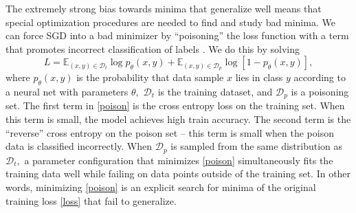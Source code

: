 \documentclass{article}
\begin{document}


The extremely strong bias towards minima that generalize well means that special optimization procedures are needed to find and study bad minima.  We can force SGD into a bad minimizer by ``poisoning'' the loss function with a term that promotes incorrect classification of labels \cite{steinhardt2017poison}.
We do this by solving
    \begin{equation}
        L = \mathbb{E}_{(x,y)\in \mathcal{D}_{t}} \log p_{\theta}(x,y) + \mathbb{E}_{(x,y)\in\mathcal{D}_p}\log[1-p_{\theta}(x,y)],
        \label{poison}
    \end{equation}
%
where $p_{\theta}(x,y)$ is the probability that data sample $x$ lies in class $y$ according to a neural net with parameters $\theta,$ $ \mathcal{D}_{t}$ is the training dataset, and  $\mathcal{D}_{p}$ is a poisoning set.
    The first term in \eqref{poison} is the cross entropy loss on the training set. When this term is small, the model achieves high train accuracy. The second term is the ``reverse'' cross entropy on the poison set -- this term is small when the poison data is classified incorrectly.  When $\mathcal{D}_{p}$ is sampled from the same distribution as  $ \mathcal{D}_{t},$ a parameter configuration that minimizes \eqref{poison} simultaneously fits the training data well while failing on data points outside of the training set.
     In other words, minimizing \eqref{poison} is an explicit search for minima of the original training loss \eqref{loss} that fail to generalize.
\end{document}
